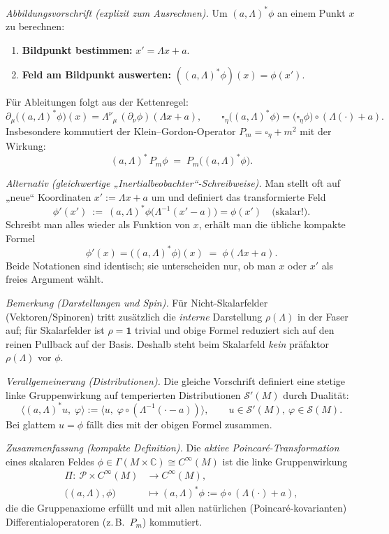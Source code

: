 \documentclass[10pt, letterpaper]{article}
\begin{document}
\emph{Abbildungsvorschrift (explizit zum Ausrechnen).}
Um $(a,\Lambda)^*\phi$ an einem Punkt $x$ zu berechnen:
\begin{enumerate}
  \item \textbf{Bildpunkt bestimmen:} $x'=\Lambda x + a$.
  \item \textbf{Feld am Bildpunkt auswerten:} $((a,\Lambda)^*\phi)(x)=\phi(x')$.
\end{enumerate}
Für Ableitungen folgt aus der Kettenregel:
\[
\partial_\mu\bigl((a,\Lambda)^*\phi\bigr)(x)
= \Lambda^\nu{}_{\mu}\,(\partial_\nu\phi)(\Lambda x+a),\qquad
\square_\eta\bigl((a,\Lambda)^*\phi\bigr)=\bigl(\square_\eta\phi\bigr)\circ(\Lambda(\cdot)+a).
\]
Insbesondere kommutiert der Klein–Gordon-Operator $P_m=\square_\eta+m^2$ mit der Wirkung:
\[
(a,\Lambda)^*\,P_m\phi \;=\; P_m\bigl((a,\Lambda)^*\phi\bigr).
\]

\emph{Alternativ (gleichwertige „Inertialbeobachter“-Schreibweise).}
Man stellt oft auf „neue“ Koordinaten $x':=\Lambda x + a$ um und definiert das transformierte Feld
\[
\phi'(x')\ :=\ (a,\Lambda)^*\phi\bigl(\Lambda^{-1}(x'-a)\bigr)
=\phi(x')\quad\text{(skalar!)}.
\]
Schreibt man alles wieder als Funktion von $x$, erhält man die übliche kompakte Formel
\[
\boxed{\quad \phi'(x) = \bigl((a,\Lambda)^*\phi\bigr)(x)
\;=\; \phi(\Lambda x + a).\quad}
\]
Beide Notationen sind identisch; sie unterscheiden nur, ob man $x$ oder $x'$ als freies Argument wählt.

\emph{Bemerkung (Darstellungen und Spin).}
Für Nicht-Skalarfelder (Vektoren/Spinoren) tritt zusätzlich die \emph{interne} Darstellung
$\rho(\Lambda)$ in der Faser auf; für Skalarfelder ist $\rho=\mathbf{1}$ trivial und obige Formel
reduziert sich auf den reinen Pullback auf der Basis. Deshalb steht beim Skalarfeld \emph{kein}
präfaktor $\rho(\Lambda)$ vor $\phi$.

\emph{Verallgemeinerung (Distributionen).}
Die gleiche Vorschrift definiert eine stetige linke Gruppenwirkung auf temperierten
Distributionen $\mathcal{S}'(M)$ durch Dualität:
\[
\langle (a,\Lambda)^*u,\; \varphi\rangle
:= \langle u,\; \varphi\circ(\Lambda^{-1}(\cdot - a)) \rangle,
\qquad u\in\mathcal{S}'(M),\ \varphi\in\mathcal{S}(M).
\]
Bei glattem $u=\phi$ fällt dies mit der obigen Formel zusammen.

\emph{Zusammenfassung (kompakte Definition).}
Die \emph{aktive Poincaré-Transformation} eines skalaren Feldes
$\phi\in\Gamma(M\times\mathbb{C})\cong C^\infty(M)$ ist die linke Gruppenwirkung
\[
\boxed{\;
\begin{aligned}
\Pi:\ \mathcal{P}\times C^\infty(M)&\longrightarrow C^\infty(M),\\
\bigl((a,\Lambda),\phi\bigr)&\longmapsto (a,\Lambda)^*\phi:=\phi\circ(\Lambda(\cdot)+a),
\end{aligned}
\;}
\]
die die Gruppenaxiome erfüllt und mit allen natürlichen (Poincaré-kovarianten)
Differentialoperatoren (z.\,B.\ $P_m$) kommutiert.

\pagebreak
\printbibliography
\end{document}
